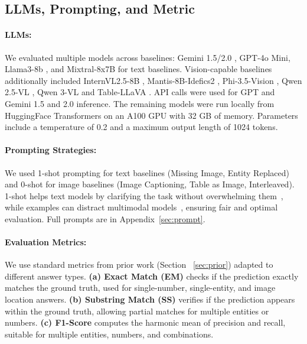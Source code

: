 \documentclass[11pt]{article}
\begin{document}
\subsection{LLMs, Prompting, and Metric}

\paragraph{LLMs:} We evaluated multiple models across baselines: Gemini 1.5/2.0 \cite{team2024gemini}, GPT-4o Mini, Llama3-8b \cite{touvron2023llama}, and Mixtral-8x7B \cite{jiang2024mixtral} for text baselines. Vision-capable baselines additionally included InternVL2.5-8B \cite{kweon-etal-2023-open}, Mantis-8B-Idefics2 \cite{jiang2024mantis}, Phi-3.5-Vision \cite{abdin2024phi}, Qwen 2.5-VL \cite{wang2024qwen2}, Qwen 3-VL \cite{bai2025qwen3vltechnicalreport} and Table-LLaVA \cite{zheng2024multimodal}. API calls were used for GPT and Gemini 1.5 and 2.0 inference. The remaining models were run locally from HuggingFace Transformers on an A100 GPU with 32 GB of memory.
Parameters include a temperature of 0.2 and a maximum output length of 1024 tokens.

\vspace{-0.3em}
\paragraph{Prompting Strategies:} We used 1-shot prompting for text baselines (Missing Image, Entity Replaced) and 0-shot for image baselines (Image Captioning, Table as Image, Interleaved). 1-shot helps text models by clarifying the task without overwhelming them~\cite{sahoo2025systematicsurveypromptengineering}, while examples can distract multimodal models~\cite{ma-etal-2025-caution}, ensuring fair and optimal evaluation. Full prompts are in Appendix~\ref{sec:prompt}.
\vspace{-0.3em}
\paragraph{Evaluation Metrics:} We use standard metrics from prior work (Section ~\ref{sec:prior}) adapted to different answer types. \textbf{(a) Exact Match (EM)} checks if the prediction exactly matches the ground truth, used for single-number, single-entity, and image location answers. \textbf{(b) Substring Match (SS)} verifies if the prediction appears within the ground truth, allowing partial matches for multiple entities or numbers. \textbf{(c) F1-Score} computes the harmonic mean of precision and recall, suitable for multiple entities, numbers, and combinations.
\end{document}
